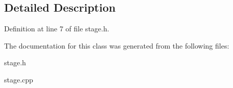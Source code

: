 \subsection{Detailed Description}


Definition at line 7 of file stage.\+h.



The documentation for this class was generated from the following files\+:\begin{DoxyCompactItemize}
\item 
stage.\+h\item 
stage.\+cpp\end{DoxyCompactItemize}
